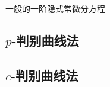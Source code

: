 
\begin{issues}
\issueDraft
\end{issues}

一般的一阶隐式常微分方程
\subsection{$p$-判别曲线法}\label{sub_ODEa6_1}

\subsection{$c$-判别曲线法}\label{sub_ODEa6_2}